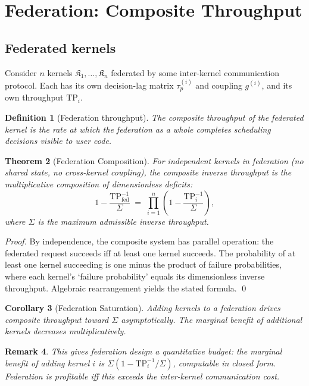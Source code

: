 \documentclass[twocolumn,11pt,a4paper]{article}
\newtheorem{theorem}{Theorem}[section]
\newtheorem{corollary}[theorem]{Corollary}
\newtheorem{definition}[theorem]{Definition}
\newtheorem{remark}[theorem]{Remark}
\newcommand{\TP}{\mathrm{TP}}
\newcommand{\taup}{\tau_p}
\newcommand{\Kernel}{\mathfrak{K}}
\begin{document}
\section{Federation: Composite Throughput}
\label{sec:federation}

\subsection{Federated kernels}

Consider $n$ kernels $\Kernel_1, \ldots, \Kernel_n$ federated by some inter-kernel communication protocol. Each has its own decision-lag matrix $\taup^{(i)}$ and coupling $g^{(i)}$, and its own throughput $\TP_i$.

\begin{definition}[Federation throughput]
\label{def:fed-tp}
The \emph{composite throughput} of the federated kernel is the rate at which the federation as a whole completes scheduling decisions visible to user code.
\end{definition}

\begin{theorem}[Federation Composition]
\label{thm:federation}
For independent kernels in federation (no shared state, no cross-kernel coupling), the composite inverse throughput is the multiplicative composition of dimensionless deficits:
\[
1 - \frac{\TP_\mathrm{fed}^{-1}}{\Sigma} \;=\; \prod_{i=1}^n \left(1 - \frac{\TP_i^{-1}}{\Sigma}\right),
\]
where $\Sigma$ is the maximum admissible inverse throughput.
\end{theorem}

\begin{proof}
By independence, the composite system has parallel operation: the federated request succeeds iff at least one kernel succeeds. The probability of at least one kernel succeeding is one minus the product of failure probabilities, where each kernel's `failure probability' equals its dimensionless inverse throughput. Algebraic rearrangement yields the stated formula. \qed
\end{proof}

\begin{corollary}[Federation Saturation]
\label{cor:fed-sat}
Adding kernels to a federation drives composite throughput toward $\Sigma$ asymptotically. The marginal benefit of additional kernels decreases multiplicatively.
\end{corollary}

\begin{remark}
This gives federation design a quantitative budget: the marginal benefit of adding kernel $i$ is $\Sigma(1 - \TP_i^{-1}/\Sigma)$, computable in closed form. Federation is profitable iff this exceeds the inter-kernel communication cost.
\end{remark}
\end{document}
